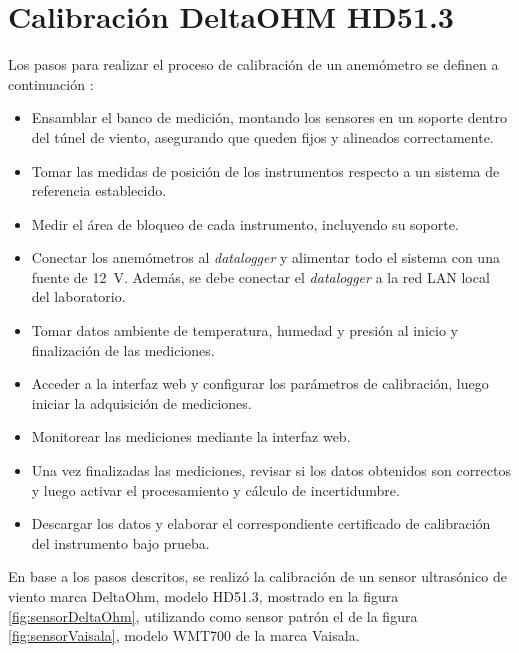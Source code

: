 \section{Calibración DeltaOHM HD51.3}\label{sec:calibDeltaOhm}

Los pasos para realizar el proceso de calibración de un anemómetro se definen a continuación \cite{ISO16622} \cite{IEC61400-12-1}  \cite{procedimientoSMNLaboratorio2024}:
\begin{itemize}
    \item Ensamblar el banco de medición, montando los sensores en un soporte dentro del túnel de viento, asegurando que queden fijos y alineados correctamente.
    \item Tomar las medidas de posición de los instrumentos respecto a un sistema de referencia establecido.
    \item Medir el área de bloqueo de cada instrumento, incluyendo su soporte.
    \item Conectar los anemómetros al \textit{datalogger} y alimentar todo el sistema con una fuente de \SI{12}{V}. Además, se debe conectar el \textit{datalogger} a la red LAN local del laboratorio.
    \item Tomar datos ambiente de temperatura, humedad y presión al inicio y finalización de las mediciones.
    \item Acceder a la interfaz web y configurar los parámetros de calibración, luego iniciar la adquisición de mediciones.
    \item Monitorear las mediciones mediante la interfaz web.
    \item Una vez finalizadas las mediciones, revisar si los datos obtenidos son correctos y luego activar el procesamiento y cálculo de incertidumbre.
    \item Descargar los datos y elaborar el correspondiente certificado de calibración del instrumento bajo prueba.
\end{itemize}



En base a los pasos descritos, se realizó la calibración de un sensor ultrasónico de viento marca DeltaOhm, modelo HD51.3, mostrado en la figura \ref{fig:sensorDeltaOhm}, utilizando como sensor patrón el de la figura \ref{fig:sensorVaisala}, modelo WMT700 de la marca Vaisala.

